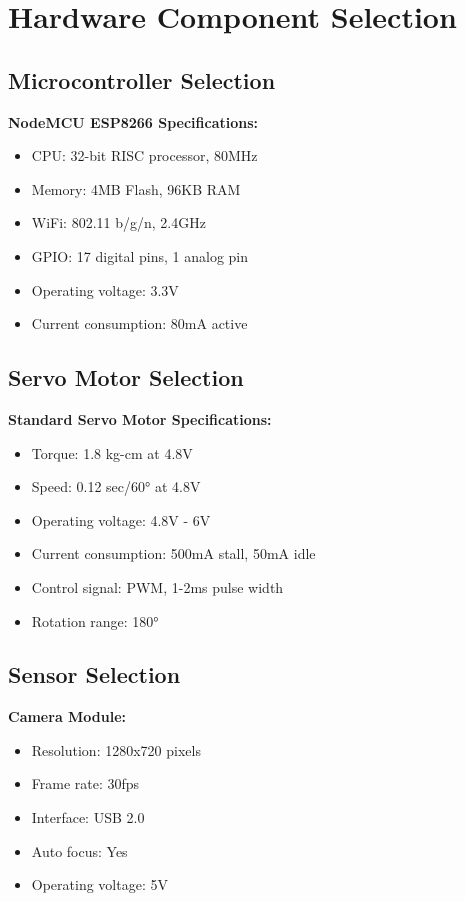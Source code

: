 \section{Hardware Component Selection}

\subsection{Microcontroller Selection}
\textbf{NodeMCU ESP8266 Specifications:}
\begin{itemize}
\item CPU: 32-bit RISC processor, 80MHz
\item Memory: 4MB Flash, 96KB RAM
\item WiFi: 802.11 b/g/n, 2.4GHz
\item GPIO: 17 digital pins, 1 analog pin
\item Operating voltage: 3.3V
\item Current consumption: 80mA active
\end{itemize}

\subsection{Servo Motor Selection}
\textbf{Standard Servo Motor Specifications:}
\begin{itemize}
\item Torque: 1.8 kg-cm at 4.8V
\item Speed: 0.12 sec/60° at 4.8V
\item Operating voltage: 4.8V - 6V
\item Current consumption: 500mA stall, 50mA idle
\item Control signal: PWM, 1-2ms pulse width
\item Rotation range: 180°
\end{itemize}

\subsection{Sensor Selection}
\textbf{Camera Module:}
\begin{itemize}
\item Resolution: 1280x720 pixels
\item Frame rate: 30fps
\item Interface: USB 2.0
\item Auto focus: Yes
\item Operating voltage: 5V
\end{itemize}

